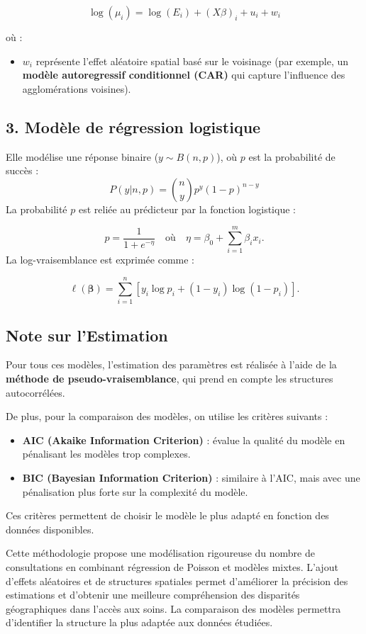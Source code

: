 \documentclass[
]{article}
\providecommand{\tightlist}{%
  \setlength{\itemsep}{0pt}\setlength{\parskip}{0pt}}
\begin{document}
\[
\log(\mu_i) = \log(E_i) + (X\beta)_i + u_i + w_i
\]

où :

\begin{itemize}
\tightlist
\item
  \(w_i\) représente l'effet aléatoire spatial basé sur le voisinage
  (par exemple, un \textbf{modèle autoregressif conditionnel (CAR)} qui
  capture l'influence des agglomérations voisines).
\end{itemize}

\subsection{3. Modèle de régression
logistique}\label{moduxe8le-de-ruxe9gression-logistique}

Elle modélise une réponse binaire (\(y \sim B(n, p)\)), où \(p\) est la
probabilité de succès : \[
P(y | n, p) = \binom{n}{y} p^y (1-p)^{n-y}
\] La probabilité \(p\) est reliée au prédicteur par la fonction
logistique :

\[
p = \frac{1}{1 + e^{-\eta}} \quad \text{où} \quad \eta = \beta_0 + \sum_{i=1}^m \beta_i x_i.
\] La log-vraisemblance est exprimée comme :

\[
\ell(\boldsymbol{\beta}) = \sum_{i=1}^n \left[ y_i \log{p_i} + (1-y_i) \log{(1-p_i)} \right].
\]

\subsection{Note sur l'Estimation}\label{note-sur-lestimation}

Pour tous ces modèles, l'estimation des paramètres est réalisée à l'aide
de la \textbf{méthode de pseudo-vraisemblance}, qui prend en compte les
structures autocorrélées.

De plus, pour la comparaison des modèles, on utilise les critères
suivants :

\begin{itemize}
\tightlist
\item
  \textbf{AIC (Akaike Information Criterion)} : évalue la qualité du
  modèle en pénalisant les modèles trop complexes.
\item
  \textbf{BIC (Bayesian Information Criterion)} : similaire à l'AIC,
  mais avec une pénalisation plus forte sur la complexité du modèle.
\end{itemize}

Ces critères permettent de choisir le modèle le plus adapté en fonction
des données disponibles.

Cette méthodologie propose une modélisation rigoureuse du nombre de
consultations en combinant régression de Poisson et modèles mixtes.
L'ajout d'effets aléatoires et de structures spatiales permet
d'améliorer la précision des estimations et d'obtenir une meilleure
compréhension des disparités géographiques dans l'accès aux soins. La
comparaison des modèles permettra d'identifier la structure la plus
adaptée aux données étudiées.
\end{document}

